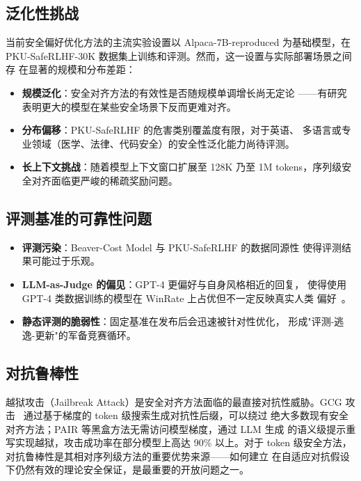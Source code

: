 \documentclass[12pt,a4paper,UTF8]{ctexart}
\begin{document}
\subsection{泛化性挑战}

当前安全偏好优化方法的主流实验设置以 Alpaca-7B-reproduced 为基础模型，在
PKU-SafeRLHF-30K 数据集上训练和评测。然而，这一设置与实际部署场景之间存
在显著的规模和分布差距：

\begin{itemize}[leftmargin=2em]
  \item \textbf{规模泛化}：安全对齐方法的有效性是否随规模单调增长尚无定论
    ——有研究表明更大的模型在某些安全场景下反而更难对齐。
  \item \textbf{分布偏移}：PKU-SafeRLHF 的危害类别覆盖度有限，对于英语、
    多语言或专业领域（医学、法律、代码安全）的安全性泛化能力尚待评测。
  \item \textbf{长上下文挑战}：随着模型上下文窗口扩展至 128K 乃至 1M
    tokens，序列级安全对齐面临更严峻的稀疏奖励问题。
\end{itemize}

\subsection{评测基准的可靠性问题}

\begin{itemize}[leftmargin=2em]
  \item \textbf{评测污染}：Beaver-Cost Model 与 PKU-SafeRLHF 的数据同源性
    使得评测结果可能过于乐观。
  \item \textbf{LLM-as-Judge 的偏见}：GPT-4 更偏好与自身风格相近的回复，
    使得使用 GPT-4 类数据训练的模型在 WinRate 上占优但不一定反映真实人类
    偏好~\cite{zheng2023mtbench}。
  \item \textbf{静态评测的脆弱性}：固定基准在发布后会迅速被针对性优化，
    形成"评测-逃逸-更新"的军备竞赛循环。
\end{itemize}

\subsection{对抗鲁棒性}

越狱攻击（Jailbreak Attack）是安全对齐方法面临的最直接对抗性威胁。GCG 攻
击~\cite{zou2023gcg} 通过基于梯度的 token 级搜索生成对抗性后缀，可以绕过
绝大多数现有安全对齐方法；PAIR 等黑盒方法无需访问模型梯度，通过 LLM 生成
的语义级提示重写实现越狱，攻击成功率在部分模型上高达 90\% 以上。对于
token 级安全方法，对抗鲁棒性是其相对序列级方法的重要优势来源——如何建立
在自适应对抗假设下仍然有效的理论安全保证，是最重要的开放问题之一。
\end{document}

